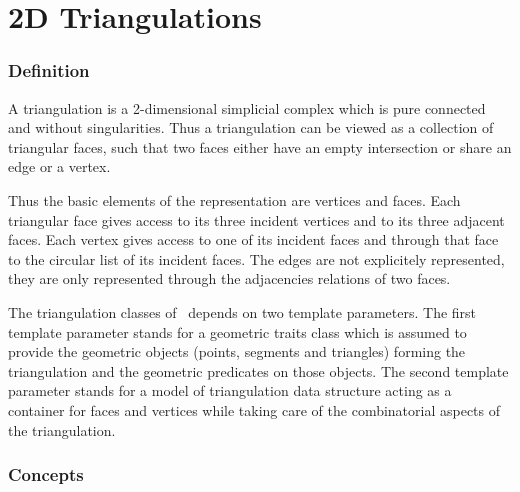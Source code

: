 
\chapter{2D Triangulations}

\subsection*{Definition}
A triangulation is a 2-dimensional simplicial complex which is pure
connected and without singularities. Thus a triangulation
can be viewed as a collection of triangular faces,
such that two faces either have an empty intersection or share an edge or a vertex.

Thus the basic elements of the representation are vertices and faces.
Each triangular face gives access to its three incident vertices 
and to its three adjacent faces. 
Each vertex gives access to one of its incident faces
and through that face to the circular list of its incident faces.
The edges are not explicitely represented, they are only represented 
through the adjacencies relations of two faces.

The triangulation classes of \cgal\ depends on two template parameters.
The first template parameter stands for
 a geometric traits class which is assumed to provide
the geometric objects (points, segments and triangles) 
forming  the triangulation and the geometric predicates on those objects.
The second template parameter stands for a model
of  triangulation data
structure acting as a container for faces and vertices
while  taking care of the combinatorial aspects of the triangulation. 



\subsection*{Concepts}
 \\
 \\
 \\

